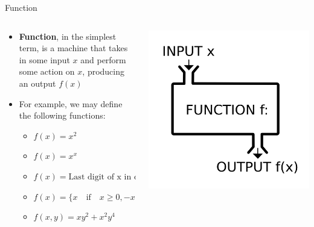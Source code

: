\documentclass[10pt,xcolor={table,dvipsnames},t]{beamer}
\begin{document}
\begin{frame}{Function}
  \begin{columns}
    \begin{column}[T]{0.6\textwidth}
      \begin{itemize}
        \item \textbf{Function}, in the simplest term, is a machine that takes in some input $x$ and perform some action on $x$, producing an output $f(x)$
        \item For example, we may define the following functions:
        \begin{itemize}
          \item $f(x) = x^2$
          \item $f(x) = x^x$
          \item $f(x) = \text{Last digit of x in decimal}$
          \item $f(x) = \{x \quad \text{if} \quad x\geq 0, -x \quad \text{if} \quad x < 0\}$
          \item $f(x,y) = xy^2 + x^2 y^4$
        \end{itemize}
      \end{itemize}
    \end{column}
    \begin{column}[T]{0.4\textwidth}
      \includegraphics[width=\textwidth]{img/function_as_machine.png}
    \end{column}
  \end{columns}
\end{frame}
\end{document}
